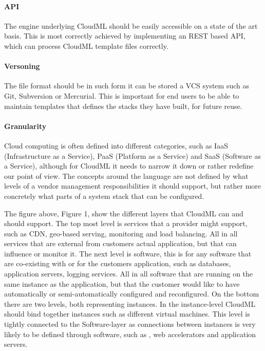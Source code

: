 \paragraph{API}
The engine underlying CloudML should be easily accessible on a state of the art basis. 
This is most correctly achieved by implementing an REST based API, which can process CloudML template files correctly. 

\paragraph{Versoning}
The file format should be in such form it can be stored a VCS system such as Git, Subversion or Mercurial. 
This is important for end users to be able to maintain templates that defines the stacks they have built, for future reuse.

\paragraph{Granularity}
Cloud computing is often defined into different categories, such as IaaS (Infrastructure as a Service), 
PaaS (Platform as a Service) and SaaS (Software as a Service), although for CloudML it needs to narrow it down or rather redefine our point of view.
The concepts around the language are not defined by what levels of a vendor management responsibilities it should support, 
but rather more concretely what parts of a system stack that can be configured.

The figure above, Figure 1, show the different layers that CloudML can and should support. 
The top most level is services that a provider might support, such as CDN, geo-based serving, monitoring and load balancing. 
All in all services that are external from customers actual application, but that can influence or monitor it.
The next level is software, this is for any software that are co-existing with or for the customers application, 
such as databases, application servers, logging services. All in all software that are running on the same instance as the application, 
but that the customer would like to have automatically or semi-automatically configured and reconfigured.
On the bottom there are two levels, both representing instances. In the instance-level CloudML should bind together instances 
such as different virtual machines. This level is tightly connected to the Software-layer as connections between instances 
is very likely to be defined through software, such as , web accelerators and application servers.
